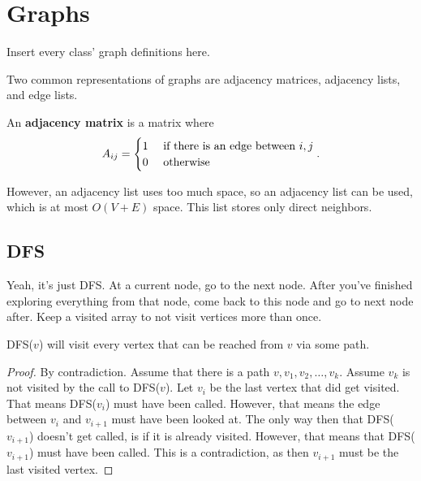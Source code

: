 
\section{Graphs}

Insert every class' graph definitions here.

Two common representations of graphs are adjacency matrices, adjacency lists, and edge lists.

\begin{definition}
	An \textbf{adjacency matrix} is a matrix where \[
		A_{ij} = \begin{cases}
			1 &\text{ if there is an edge between \( i,j \)}\\
			0 &\text{ otherwise}
		\end{cases}
	.\] 
\end{definition}

However, an adjacency list uses too much space, so an adjacency list can be used, which is at most \( O(V + E) \) space. This list stores only direct neighbors.

\subsection{DFS}

Yeah, it's just DFS. At a current node, go to the next node. After you've finished exploring everything from that node, come back to this node and go to next node after. Keep a visited array to not visit vertices more than once.

\begin{lemma}
	DFS(\( v \)) will visit every vertex that can be reached from \( v \) via some path.
\end{lemma}
\begin{proof}
	By contradiction. Assume that there is a path \( v, v_{1}, v_{2}, \ldots , v_k \). Assume \( v_k \) is not visited by the call to DFS(\( v \)). Let \( v_i \) be the last vertex that did get visited. That means DFS(\( v_i \)) must have been called. However, that means the edge between \( v_{i} \) and \( v_{i+1} \) must have been looked at. The only way then that DFS(\( v_{i+1} \)) doesn't get called, is if it is already visited. However, that means that DFS(\( v_{i+1} \)) must have been called. This is a contradiction, as then \( v_{i+1} \) must be the last visited vertex.
\end{proof}
